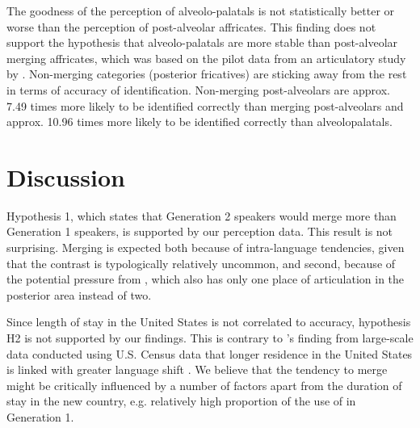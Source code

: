 \documentclass[output=paper,modfonts,newtxmath,hidelinks,]{langscibook}
\begin{document}
The goodness of the perception of alveolo-palatals is not statistically better or worse than the perception of post-alveolar affricates. This finding does not support the hypothesis that alveolo-palatals are more stable than post-alveolar merging affricates, which was based on the pilot data from an articulatory study by \citet{Cavar-etal2016}. Non-merging categories (posterior fricatives) are sticking away from the rest in terms of accuracy of identification. Non-merging post-alveolars are approx. 7.49 times more likely to be identified correctly than merging post-alveolars and approx. 10.96 times more likely to be identified correctly than alveolopalatals.



\section{Discussion}\label{sec:mihajlovic:6}

Hypothesis 1, which states that Generation 2 speakers would merge more than Generation 1 speakers, is supported by our perception data. This result is not surprising. Merging is expected both because of intra-language tendencies, given that the contrast is typologically relatively uncommon, and second, because of the potential pressure from , which also has only one place of articulation in the posterior area instead of two.



Since length of stay in the United States is not correlated to accuracy, hypothesis H2 is not supported by our findings. This is contrary to \citeauthor{Veltman2000}’s finding from large-scale  data conducted using U.S. Census data that longer residence in the United States is linked with greater language shift \citep[66]{Veltman2000}. We believe that the tendency to merge might be critically influenced by a number of factors apart from the duration of stay in the new country, e.g. relatively high proportion of the use of  in Generation 1.
\end{document}
